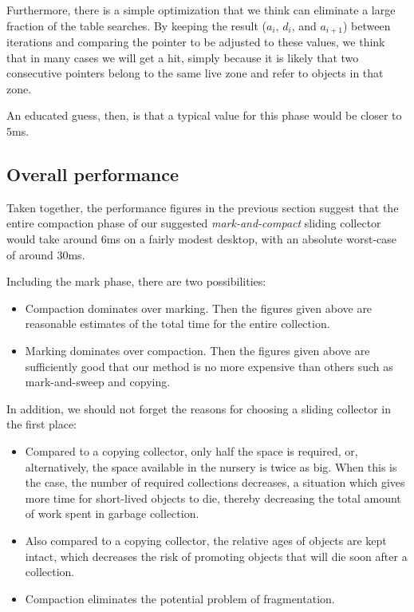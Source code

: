 Furthermore, there is a simple optimization that we think can
eliminate a large fraction of the table searches.  By keeping the
result ($a_i$, $d_i$, and $a_{i+1}$) between iterations and comparing
the pointer to be adjusted to these values, we think that in many
cases we will get a hit, simply because it is likely that two
consecutive pointers belong to the same live zone and refer to objects
in that zone.  

An educated guess, then, is that a typical value for this phase would
be closer to $5$ms. 

\subsection{Overall performance}

Taken together, the performance figures in the previous section
suggest that the entire compaction phase of our suggested
\emph{mark-and-compact} sliding collector would take around $6$ms on a
fairly modest desktop, with an absolute worst-case of around $30$ms.

Including the mark phase, there are two possibilities:

\begin{itemize}
\item Compaction dominates over marking.  Then the figures given above
  are reasonable estimates of the total time for the entire
  collection.
\item Marking dominates over compaction.  Then the figures given above
  are sufficiently good that our method is no more expensive than
  others such as mark-and-sweep and copying. 
\end{itemize}

In addition, we should not forget the reasons for choosing a
sliding collector in the first place:

\begin{itemize}
\item Compared to a copying collector, only half the space is
  required, or, alternatively, the space available in the nursery is
  twice as big.  When this is the case, the number of required
  collections decreases, a situation which gives more time for
  short-lived objects to die, thereby decreasing the total amount of
  work spent in garbage collection.
\item Also compared to a copying collector, the relative ages of
  objects are kept intact, which decreases the risk of promoting
  objects that will die soon after a collection. 
\item Compaction eliminates the potential problem of fragmentation. 
\end{itemize}

